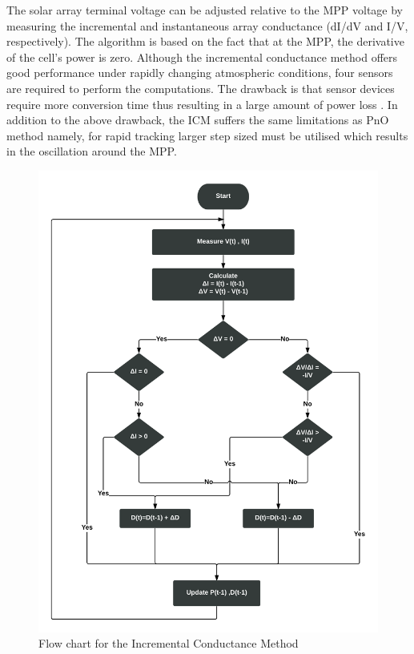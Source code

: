 {  The  solar array terminal  voltage  can  be  adjusted relative to the MPP voltage by measuring the incremental and instantaneous  array  conductance (dI/dV and I/V, respectively). The algorithm is based on the fact that at the \ac{MPP}, the derivative of the cell's power is zero. Although  the  incremental  conductance method offers good performance under rapidly changing atmospheric  conditions, four  sensors  are  required to perform the computations. The  drawback is that sensor devices require  more  conversion  time  thus  resulting in a large amount of power loss \cite{gomathy2012design}. In addition to the above drawback, the \ac{ICM} suffers the same limitations as \ac{PnO} method namely, for rapid tracking larger step sized must be utilised which results in the oscillation around the \ac{MPP}. \\
  
   \begin{figure}[H]
      \begin{center}
      \includegraphics[width=\textwidth]{images/INc_flow}
      \caption{ Flow chart for the Incremental Conductance Method}
      \label{fig:inCflow}
      \end{center}
      \end{figure}
      
}
